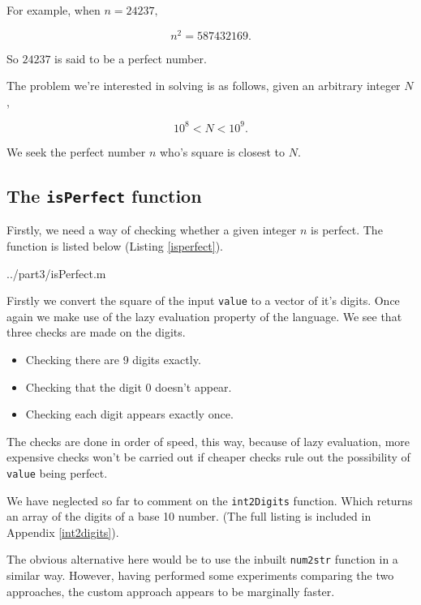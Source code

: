 \documentclass[10pt]{article}
\begin{document}
For example, when $ n = 24237, $

$$ n^2 = 587432169 .$$

So $24237$ is said to be a perfect number.

The problem we're interested in solving is as follows, given an arbitrary integer $N$,  

\begin{equation} \label{rangeN}
10^8 < N < 10^{9}.
\end{equation}


We seek the perfect number $n$ who's square is closest to $N$.

\subsection{The \texttt{isPerfect} function}

Firstly, we need a way of checking whether a given integer $n$ is perfect. The function is listed below (Listing \ref{isperfect}).

  {../part3/isPerfect.m}
 
Firstly we convert the square of the input \texttt{value} to a vector of it's digits. Once again we make use of the lazy evaluation property of the language. We see that three checks are made on the digits.
 
 \begin{itemize}
 \item Checking there are 9 digits exactly.
 \item Checking that the digit $0$ doesn't appear.
 \item Checking each digit appears exactly once.
 \end{itemize}
 
 The checks are done in order of speed, this way, because of lazy evaluation, more expensive checks won't be carried out if cheaper checks rule out the possibility of \texttt{value} being perfect.
 
We have neglected so far to comment on the \texttt{int2Digits} function. Which returns an array of the digits of a base 10 number. (The full listing is included in Appendix \ref{int2digits}).
 
 The obvious alternative here would be to use the inbuilt \texttt{num2str} function in a similar way. However, having performed some experiments comparing the two approaches, the custom approach appears to be marginally faster.
 
\end{document}
